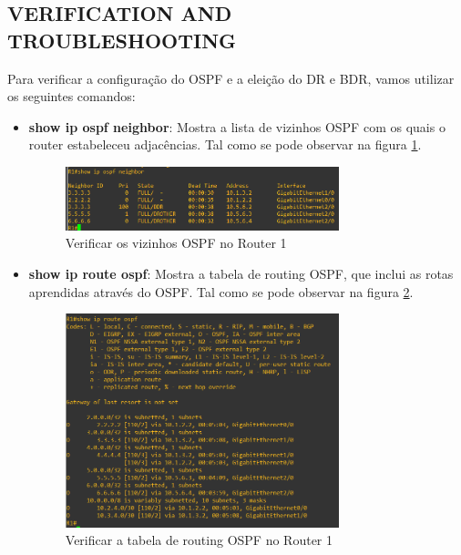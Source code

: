 \documentclass[11pt,english, openright, oneside]{book}
\begin{document}
\newpage
\subsection{VERIFICATION AND TROUBLESHOOTING}
\vspace{0.2cm}

Para verificar a configuração do OSPF e a eleição do DR e BDR, vamos utilizar os seguintes comandos:
\vspace{0.2cm}

\begin{itemize}
  \item \textbf{show ip ospf neighbor}: Mostra a lista de vizinhos OSPF com os quais o router estabeleceu adjacências. Tal como se pode observar na figura \ref{fig:config10}.
  \vspace{0.2cm}

  \begin{figure}[H]
    \centering
    \includegraphics[width=0.75\textwidth]{imagens/Tarefa2/9.ospf_neigh.png}
    \caption{Verificar os vizinhos OSPF no Router 1}
    \label{fig:config10}
  \end{figure}
  \vspace{0.2cm}

  \item \textbf{show ip route ospf}: Mostra a tabela de routing OSPF, que inclui as rotas aprendidas através do OSPF. Tal como se pode observar na figura \ref{fig:config11}.
  \vspace{0.2cm}

  \begin{figure}[H]
    \centering
    \includegraphics[width=0.75\textwidth]{imagens/Tarefa2/9.ospf_route.png}
    \caption{Verificar a tabela de routing OSPF no Router 1}
    \label{fig:config11}
  \end{figure}
  \vspace{0.2cm}


\end{itemize}
\end{document}
